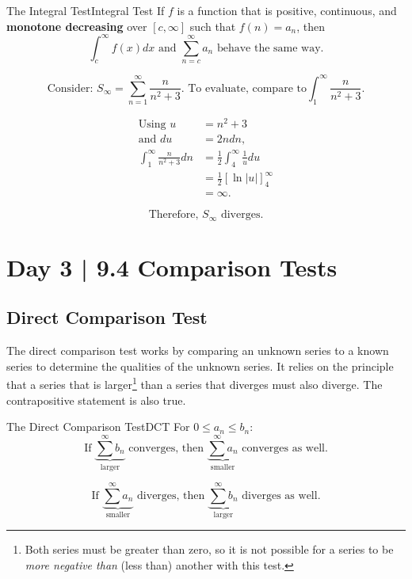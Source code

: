 \documentclass{article}
\theoremstyle{definition}
\begin{document}
\begin{theorem}{The Integral Test}{Integral Test}
    If $f$ is a function that is positive, continuous, and \textbf{monotone decreasing} over $[c, \infty]$ such that $f(n)= a_n$, then
    \vspace{-0.3cm}
    \[\int_{c}^{\infty}f(x)dx \text{ and } \sum_{n=c}^{\infty} a_n \text{ behave the same way.}\]
\end{theorem}

\[\text{Consider: } S_\infty=\sum_{n=1}^{\infty} \frac{n}{n^2+3}. \text{ To evaluate, compare to} \int_{1}^{\infty} \frac{n}{n^2+3}.\]


\begin{align*}
\text{Using } u &= n^2 + 3 \\
\text{and } du &= 2ndn, \\
\int_{1}^{\infty} \frac{n}{n^2+3}dn &= \frac{1}{2} \int_{4}^{\infty} \frac{1}{u}du \\
&= \frac{1}{2} [\ln|u|]^{\infty}_{4}\\
&= \infty.
\end{align*}

\[\text{Therefore, $S_\infty$ diverges.}\]

\newpage

\section{Day 3 | 9.4 Comparison Tests}

\subsection{Direct Comparison Test}
The direct comparison test works by comparing an unknown series to a known series to determine the qualities of the unknown series. It relies on the principle that a series that is larger\footnote{Both series must be greater than zero, so it is not possible for a series to be \emph{more negative than} (less than) another with this test.} than a series that diverges must also diverge. The contrapositive statement is also true.

\begin{theorem}{The Direct Comparison Test}{DCT}
    For $0 \le a_n \le b_n$:
            \[\text{If } \underbrace{\sum^{\infty} b_n}_{\text{larger}} \text{ converges, then } \underbrace{\sum^{\infty} a_n}_{\text{smaller}} \text{ converges as well.}\]

            \[\text{If } \underbrace{\sum^{\infty} a_n}_{\text{smaller}} \text{ diverges, then } \underbrace{\sum^{\infty} b_n}_{\text{larger}} \text{ diverges as well.}\]

\end{theorem}
\end{document}
